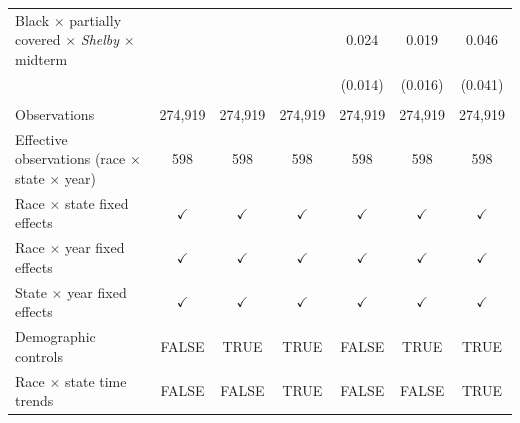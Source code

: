 \begin{tabular}{lcccccc}
   Black $\times$ partially covered $\times$ \textit{Shelby} $\times$ midterm          &               &               &               & 0.024         & 0.019         & 0.046\\   
                                                                                       &               &               &               & (0.014)       & (0.016)       & (0.041)\\   
    \\
   Observations                                                                        & 274,919       & 274,919       & 274,919       & 274,919       & 274,919       & 274,919\\  
   Effective observations (race $\times$ state $\times$ year)                          & 598           & 598           & 598           & 598           & 598           & 598\\  
   \midrule 
   Race $\times$ state fixed effects                                                   & $\checkmark$  & $\checkmark$  & $\checkmark$  & $\checkmark$  & $\checkmark$  & $\checkmark$\\   
   Race $\times$ year fixed effects                                                    & $\checkmark$  & $\checkmark$  & $\checkmark$  & $\checkmark$  & $\checkmark$  & $\checkmark$\\   
   State $\times$ year fixed effects                                                   & $\checkmark$  & $\checkmark$  & $\checkmark$  & $\checkmark$  & $\checkmark$  & $\checkmark$\\   
   Demographic controls                                                                & FALSE         & TRUE          & TRUE          & FALSE         & TRUE          & TRUE\\  
   Race $\times$ state time trends                                                     & FALSE         & FALSE         & TRUE          & FALSE         & FALSE         & TRUE\\  
   \bottomrule
\end{tabular}
\par\endgroup


